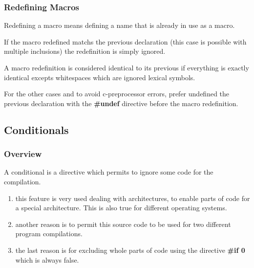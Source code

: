 \documentclass[8pt]{beamer}
\newcommand{\nl}[0]{\vspace{0.4cm}}
\begin{document}
\begin{frame}
  \frametitle{Redefining Macros}

  Redefining a macro means defining a name that is already in use as a macro.

  \nl

  If the macro redefined matchs the previous declaration (this case is possible
  with multiple inclusions) the redefinition is simply ignored.

  \nl

  A macro redefinition is considered identical to its previous if everything is
  exactly identical excepts whitespaces which are ignored lexical symbols.

  \nl

  For the other cases and to avoid c-preprocessor errors, prefer
  undefined the previous declaration with the \textbf{\#undef} directive
  before the macro redefinition.
\end{frame}

%
%

\subsection{Conditionals}


\begin{frame}
  \frametitle{Overview}

  A conditional is a directive which permits to ignore some code for the
  compilation.

  \begin{enumerate}
    \item
      this feature is very used dealing with architectures, to enable
      parts of code for a special architecture. This is also true for
      different operating systems.
    \item
      another reason is to permit this source code to be used for
      two different program compilations.
    \item
      the last reason is for excluding whole parts of code using the
      directive \textbf{\#if 0} which is always false.
  \end{enumerate}
\end{frame}

\end{document}
